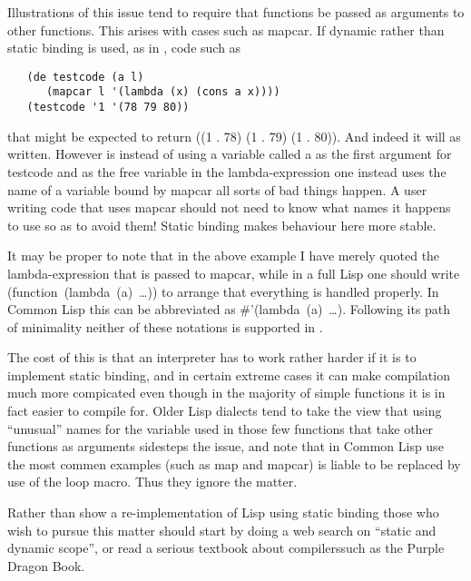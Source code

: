 Illustrations of this issue tend to require that functions be passed as
arguments to other functions. This arises with cases such as {\tx mapcar}.
If dynamic rather than static binding is used, as in \vsl, code such
as
{\small\begin{verbatim}
   (de testcode (a l)
      (mapcar l '(lambda (x) (cons a x))))
   (testcode '1 '(78 79 80))
\end{verbatim}}
that might be expected to return {\tx ((1 . 78) (1 . 79) (1 . 80))}. And indeed
it will as written. However is instead of using a variable called {\tx a} as
the first argument for {\tx testcode} and as the free variable in the
lambda-expression one instead uses the name of a variable bound by
{\tx mapcar} all sorts of bad things happen. A user writing code that
uses {\tx mapcar} should not need to know what names it happens to use so
as to avoid them! Static binding makes behaviour here more stable.

It may be proper to note that in the above example I have merely
quoted the lambda-expression that is passed to {\tx mapcar}, while in
a full Lisp one should write {\tx (function~(lambda~(a)~\ldots))} to
arrange that everything is handled properly. In Common Lisp this
can be abbreviated as {\tx \#'(lambda~(a)~\ldots)}. Following its path
of minimality neither of these notations is supported in \vsl.

The cost of this is that an interpreter has to work rather harder if it is
to implement static binding, and in certain extreme cases it can make
compilation much more compicated even though in the majority of simple
functions it is in fact easier to compile for. Older Lisp dialects tend to
take the view that using ``unusual'' names for the variable used in those
few functions that take other functions as arguments sidesteps the
issue, and note that in Common Lisp use the most commen examples
(such as {\tx map} and {\tx mapcar}) is liable to be replaced by use of the
{\tx loop} macro. Thus they ignore the matter.

Rather than show a re-implementation of Lisp using static binding those who
wish to pursue this matter should start by doing a web search on
``static and dynamic scope'', or read a serious textbook about
compilerssuch as the Purple Dragon Book\cite{PurpleDragon}.


